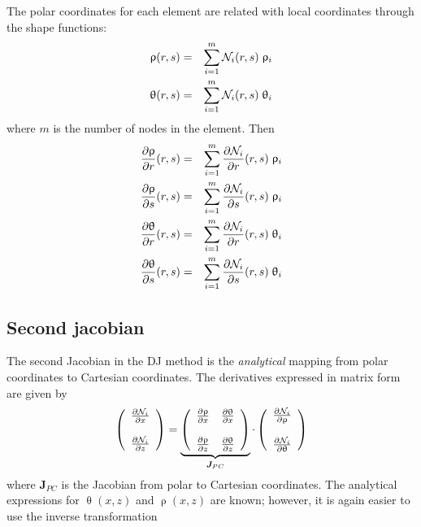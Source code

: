 The polar coordinates for each element are related with local coordinates through the shape functions:
\begin{eqnarray}
\uprho(r,s) &=&  \sum_{i=1}^m {\mathcal{N}}_i(r,s) \; \uprho_i \nonumber\\
\uptheta(r,s) &=& \sum_{i=1}^m {\mathcal{N}}_i(r,s) \; \uptheta_i \nonumber
\end{eqnarray}
where $m$ is the number of nodes in the element.
Then
\begin{eqnarray}
\frac{\partial\uprho}{\partial r}(r,s)   &=& \sum_{i=1}^m \frac{\partial{\mathcal{N}}_i}{\partial r}(r,s)\; \uprho_i \nonumber\\
\frac{\partial\uprho}{\partial s}(r,s)   &=& \sum_{i=1}^m \frac{\partial{\mathcal{N}}_i}{\partial s}(r,s)\; \uprho_i \nonumber\\
\frac{\partial\uptheta}{\partial r}(r,s) &=& \sum_{i=1}^m \frac{\partial{\mathcal{N}}_i}{\partial r}(r,s)\; \uptheta_i \nonumber\\
\frac{\partial\uptheta}{\partial s}(r,s) &=& \sum_{i=1}^m \frac{\partial{\mathcal{N}}_i}{\partial s}(r,s)\; \uptheta_i 
\end{eqnarray}



\subsection{Second jacobian}

The second Jacobian in the DJ method is the {\it analytical} 
mapping from polar coordinates to Cartesian coordinates. The derivatives 
expressed in matrix form are given by
\begin{equation}
\left(
\begin{array}{c}
\frac{\partial {\mathcal{N}}_i}{\partial x} \\ \\
\frac{\partial {\mathcal{N}}_i}{\partial z} 
\end{array}
\right)
= 
\underbrace{\left(
\begin{array}{cc}
\frac{\partial \uprho}{\partial x} & \frac{\partial \uptheta}{\partial x}  \\ \\ 
\frac{\partial \uprho}{\partial z} & \frac{\partial \uptheta}{\partial z}  
\end{array}
\right)}_{{\bm J}_{PC}}
\cdot
\left(
\begin{array}{c}
\frac{\partial {\mathcal{N}}_i}{\partial \uprho}  \\ \\
\frac{\partial {\mathcal{N}}_i}{\partial \uptheta}
\end{array}
\right)
\label{eq:DJ3}
\end{equation}
where ${\bm J}_{PC}$ is the Jacobian from polar to Cartesian coordinates. 
The analytical expressions for $\uptheta(x,z)$ and $\uprho(x,z)$ are known; 
however, it is again easier to use the inverse transformation

